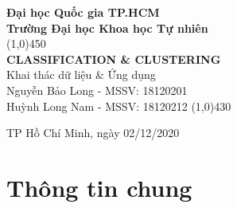 \documentclass[a4paper, 12pt]{article}
\begin{document}
\begin{titlepage}
    \begin{center}
        \vspace*{1cm}
        \Large\textbf{Đại học Quốc gia TP.HCM\\Trường Đại học Khoa học Tự nhiên}\\

        \vfill
        \line(1,0){450}\\[4mm]
        \LARGE\textbf{\MakeUppercase{Classification \& Clustering}}\\[3mm]
        \Large{Khai thác dữ liệu \& Ứng dụng}\\[3mm]
        \Large{Nguyễn Bảo Long - MSSV: 18120201}\\
        \Large{Huỳnh Long Nam - MSSV: 18120212}
        \line(1,0){430}\\
        \vfill

        \vfill
        TP Hồ Chí Minh, ngày 02/12/2020
    \end{center}
\end{titlepage}

\tableofcontents
\thispagestyle{empty}
\clearpage

\section{Thông tin chung}
\end{document}
